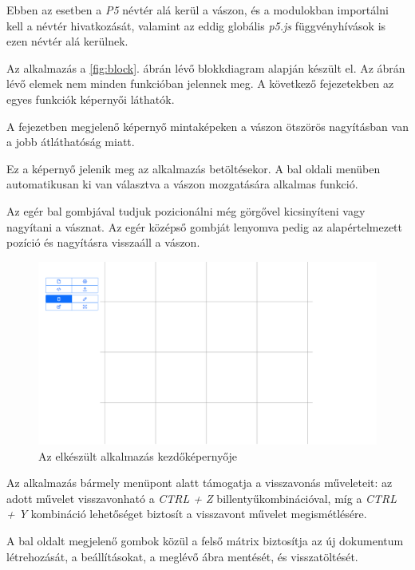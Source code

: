 Ebben az esetben a \textit{P5} névtér alá kerül a vászon, és a modulokban importálni kell a névtér hivatkozását, valamint az eddig globális \textit{p5.js} függvényhívások is ezen névtér alá kerülnek.


Az alkalmazás a \ref{fig:block}. ábrán lévő blokkdiagram alapján készült el. Az ábrán lévő elemek nem minden funkcióban jelennek meg. A következő fejezetekben az egyes funkciók képernyői láthatók. 

A fejezetben megjelenő képernyő mintaképeken a vászon ötszörös nagyításban van a jobb átláthatóság miatt.


Ez a képernyő jelenik meg az alkalmazás betöltésekor. A bal oldali menüben automatikusan ki van választva a vászon mozgatására alkalmas funkció.

Az egér bal gombjával tudjuk pozicionálni még görgővel kicsinyíteni vagy nagyítani a vásznat. Az egér középső gombját lenyomva pedig az alapértelmezett pozíció és nagyításra visszaáll a vászon.

\begin{figure}[!h]
	\label{fig:canvas}
	\centering
	\includegraphics[width=\textwidth]{images/editor_canvas.png}
	\caption{Az elkészült alkalmazás kezdőképernyője}
\end{figure}

Az alkalmazás bármely menüpont alatt támogatja a visszavonás műveleteit: az adott művelet visszavonható a \textit{CTRL + Z} billentyűkombinációval, míg a \textit{CTRL + Y} kombináció lehetőséget biztosít a visszavont művelet megismétlésére. 


A bal oldalt megjelenő gombok közül a felső mátrix biztosítja az új dokumentum létrehozását, a beállításokat, a meglévő ábra mentését, és visszatöltését.

